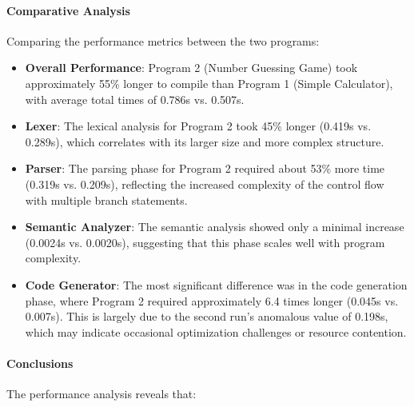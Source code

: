 \documentclass[conference]{IEEEtran}
\begin{document}




\FloatBarrier 
\paragraph{Comparative Analysis}
Comparing the performance metrics between the two programs:

\begin{itemize}
	\item \textbf{Overall Performance}: Program 2 (Number Guessing Game) took approximately 55\% longer to compile than Program 1 (Simple Calculator), with average total times of 0.786s vs. 0.507s.
	
	\item \textbf{Lexer}: The lexical analysis for Program 2 took 45\% longer (0.419s vs. 0.289s), which correlates with its larger size and more complex structure.
	
	\item \textbf{Parser}: The parsing phase for Program 2 required about 53\% more time (0.319s vs. 0.209s), reflecting the increased complexity of the control flow with multiple branch statements.
	
	\item \textbf{Semantic Analyzer}: The semantic analysis showed only a minimal increase (0.0024s vs. 0.0020s), suggesting that this phase scales well with program complexity.
	
	\item \textbf{Code Generator}: The most significant difference was in the code generation phase, where Program 2 required approximately 6.4 times longer (0.045s vs. 0.007s). This is largely due to the second run's anomalous value of 0.198s, which may indicate occasional optimization challenges or resource contention.
\end{itemize}

\paragraph{Conclusions}
The performance analysis reveals that:
\end{document}
